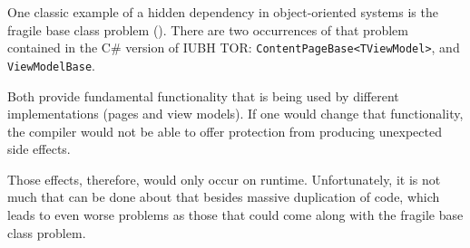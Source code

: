 One classic example of a hidden dependency in object-oriented systems is the fragile base class problem (\cite{mihailov_fragile_1998}). There are two occurrences of that problem contained in the C\# version of IUBH TOR: \texttt{ContentPageBase<TViewModel>}, and \texttt{ViewModelBase}. 

Both provide fundamental functionality that is being used by different implementations (pages and view models). If one would change that functionality, the compiler would not be able to offer protection from producing unexpected side effects. 

Those effects, therefore, would only occur on runtime. Unfortunately, it is not much that can be done about that besides massive duplication of code, which leads to even worse problems as those that could come along with the fragile base class problem.

